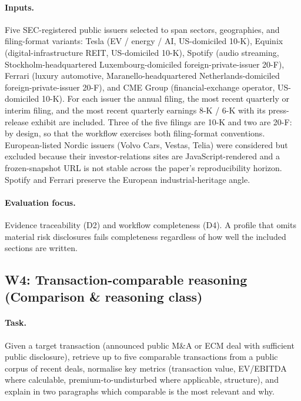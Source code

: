 \documentclass[11pt]{article}
\begin{document}
\paragraph{Inputs.} Five SEC-registered public issuers selected to span sectors, geographies, and filing-format variants: Tesla (EV / energy / AI, US-domiciled 10-K), Equinix (digital-infrastructure REIT, US-domiciled 10-K), Spotify (audio streaming, Stockholm-headquartered Luxembourg-domiciled foreign-private-issuer 20-F), Ferrari (luxury automotive, Maranello-headquartered Netherlands-domiciled foreign-private-issuer 20-F), and CME Group (financial-exchange operator, US-domiciled 10-K). For each issuer the annual filing, the most recent quarterly or interim filing, and the most recent quarterly earnings 8-K / 6-K with its press-release exhibit are included. Three of the five filings are 10-K and two are 20-F: by design, so that the workflow exercises both filing-format conventions. European-listed Nordic issuers (Volvo Cars, Vestas, Telia) were considered but excluded because their investor-relations sites are JavaScript-rendered and a frozen-snapshot URL is not stable across the paper's reproducibility horizon. Spotify and Ferrari preserve the European industrial-heritage angle.

\paragraph{Evaluation focus.} Evidence traceability (D2) and workflow completeness (D4). A profile that omits material risk disclosures fails completeness regardless of how well the included sections are written.

\subsection{W4: Transaction-comparable reasoning (Comparison \& reasoning class)}

\paragraph{Task.} Given a target transaction (announced public M\&A or ECM deal with sufficient public disclosure), retrieve up to five comparable transactions from a public corpus of recent deals, normalise key metrics (transaction value, EV/EBITDA where calculable, premium-to-undisturbed where applicable, structure), and explain in two paragraphs which comparable is the most relevant and why.
\end{document}
